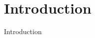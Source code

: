 
\section{Introduction}



    \begin{frame}[plain]{}

        \begin{center}

        \huge Introduction

        \end{center}

    \end{frame}



